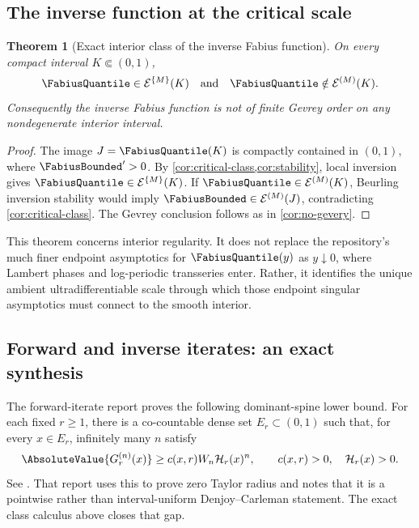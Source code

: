 \documentclass[11pt,a4paper]{article}
\newtheorem{theorem}{Theorem}[section]
\theoremstyle{definition}
\theoremstyle{remark}
\newcommand{\Roumieu}[1]{\mathcal{E}^{\{#1\}}}
\newcommand{\Beurling}[1]{\mathcal{E}^{(#1)}}
\begin{document}
\subsection{The inverse function at the critical scale}

\begin{theorem}[Exact interior class of the inverse Fabius function]
\label{thm:inverse-class}
On every compact interval $K\Subset(0,1)$,
\begin{equation}
  \FabiusQuantile\in\Roumieu{M}(K)
  \quad\text{and}\quad
  \FabiusQuantile\notin\Beurling{M}(K).
  \label{eq:inverse-class}
\end{equation}
Consequently the inverse Fabius function is not of finite Gevrey order on any
nondegenerate interior interval.
\end{theorem}

\begin{proof}
The image $J=\FabiusQuantile(K)$ is compactly contained in $(0,1)$, where
$\FabiusBounded'>0$.
By \cref{cor:critical-class,cor:stability}, local inversion gives
$\FabiusQuantile\in\Roumieu{M}(K)$.  If
$\FabiusQuantile\in\Beurling{M}(K)$, Beurling inversion stability would
imply $\FabiusBounded\in\Beurling{M}(J)$, contradicting \cref{cor:critical-class}.
The Gevrey conclusion follows as in \cref{cor:no-gevery}.
\end{proof}

This theorem concerns interior regularity.  It does not replace the repository's
much finer endpoint asymptotics for $\FabiusQuantile(y)$ as $y\downarrow0$, where Lambert phases
and log-periodic transseries enter.  Rather, it identifies the unique ambient
ultradifferentiable scale through which those endpoint singular asymptotics must
connect to the smooth interior.

\subsection{Forward and inverse iterates: an exact synthesis}

The forward-iterate report proves the following dominant-spine lower bound.  For
each fixed $r\ge1$, there is a co-countable dense set $E_r\subset(0,1)$ such that,
for every $x\in E_r$, infinitely many $n$ satisfy
\begin{equation}
  \AbsoluteValue{G_r^{(n)}(x)}
  \ge c(x,r)W_n\mathcal H_r(x)^n,
  \qquad c(x,r)>0,\quad \mathcal H_r(x)>0.
  \label{eq:imported-spine}
\end{equation}
See \cite{ProveItIterates}.  That report uses this to prove zero Taylor radius and
notes that it is a pointwise rather than interval-uniform Denjoy--Carleman statement.
The exact class calculus above closes that gap.
\end{document}
